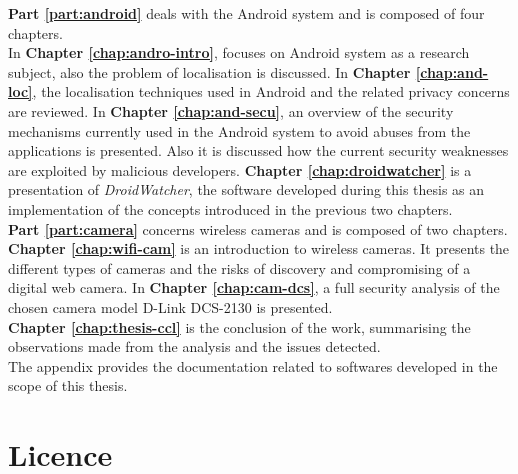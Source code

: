 \textbf{Part \ref{part:android}} deals with the Android system and is composed of four chapters.\\

In \textbf{Chapter \ref{chap:andro-intro}}, focuses on Android system as a research subject, also the problem of localisation is discussed. 
In \textbf{Chapter \ref{chap:and-loc}}, the localisation techniques used in Android and the related privacy concerns are reviewed.
In \textbf{Chapter \ref{chap:and-secu}}, an overview of the security mechanisms currently used in the Android system to avoid abuses from the applications is presented.
Also it is discussed how the current security weaknesses are exploited by malicious developers.
\textbf{Chapter \ref{chap:droidwatcher}} is a presentation of \emph{DroidWatcher}, the software developed during this thesis as an implementation of the concepts introduced in the previous two chapters.\\

\textbf{Part \ref{part:camera}} concerns wireless cameras and is composed of two chapters.\\

\textbf{Chapter \ref{chap:wifi-cam}} is an introduction to wireless cameras.
It presents the different types of cameras and the risks of discovery and compromising of a digital web camera.
In \textbf{Chapter \ref{chap:cam-dcs}}, a full security analysis of the chosen camera model D-Link DCS-2130 is presented.\\

\textbf{Chapter \ref{chap:thesis-ccl}} is the conclusion of the work, summarising the observations made from the analysis and the issues detected.\\

The appendix provides the documentation related to softwares developed in the scope of this thesis.

\section{Licence}

